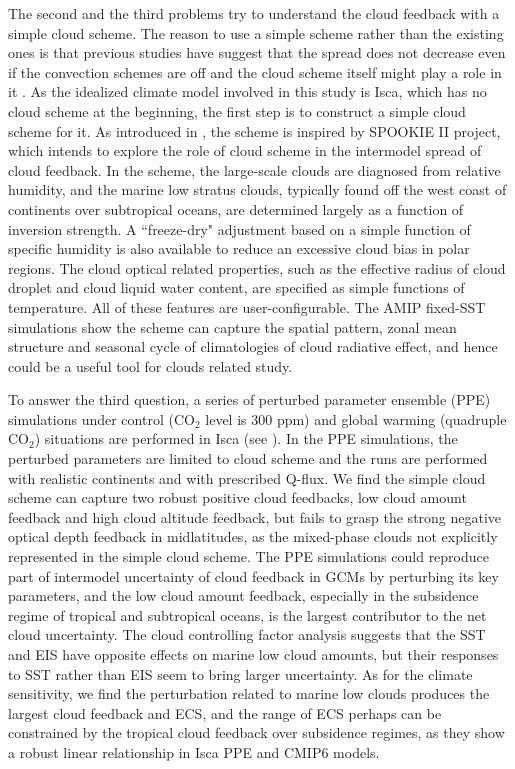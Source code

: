The second and the third problems try to understand the cloud feedback with a simple cloud scheme. The reason to use a simple scheme rather than the existing ones is that previous studies have suggest that the spread does not decrease even if the convection schemes are off \citep{Webb2015} and the cloud scheme itself might play a role in it \citep[e.g.,][]{Qu2014,Geoffroy2017}. As the idealized climate model involved in this study is Isca, which has no cloud scheme at the beginning, the first step is to construct a simple cloud scheme for it. As introduced in , the scheme \citep{Liu2021simcloud} is inspired by SPOOKIE II project, which intends to explore the role of cloud scheme in the intermodel spread of cloud feedback. In the scheme, the large-scale clouds are diagnosed from relative humidity, and the marine low stratus clouds, typically found off the west coast of continents over subtropical oceans, are determined largely as a function of inversion strength. A ``freeze-dry" adjustment based on a simple function of specific humidity is also available to reduce an excessive cloud bias in polar regions. The cloud optical related properties, such as the effective radius of cloud droplet and cloud liquid water content, are specified as simple functions of temperature. All of these features are user-configurable. The AMIP fixed-SST simulations show the scheme can capture the spatial pattern, zonal mean structure and seasonal cycle of climatologies of cloud radiative effect, and hence could be a useful tool for clouds related study. 

To answer the third question, a series of perturbed parameter ensemble (PPE) simulations under control (CO$_2$ level is 300 ppm) and global warming (quadruple CO$_2$) situations are performed in Isca (see ). In the PPE simulations, the perturbed parameters are limited to cloud scheme and the runs are performed with realistic continents and with prescribed Q-flux. We find the simple cloud scheme can capture two robust positive cloud feedbacks, low cloud amount feedback and high cloud altitude feedback, but fails to grasp the strong negative optical depth feedback in midlatitudes, as the mixed-phase clouds not explicitly represented in the simple cloud scheme. The PPE simulations could reproduce part of intermodel uncertainty of cloud feedback in GCMs by perturbing its key parameters, and the low cloud amount feedback, especially in the subsidence regime of tropical and subtropical oceans, is the largest contributor to the net cloud uncertainty. The cloud controlling factor analysis suggests that the SST and EIS have opposite effects on marine low cloud amounts, but their responses to SST rather than EIS seem to bring larger uncertainty. As for the climate sensitivity, we find the perturbation related to marine low clouds produces the largest cloud feedback and ECS, and the range of ECS perhaps can be constrained by the tropical cloud feedback over subsidence regimes, as they show a robust linear relationship in Isca PPE and CMIP6 models.

